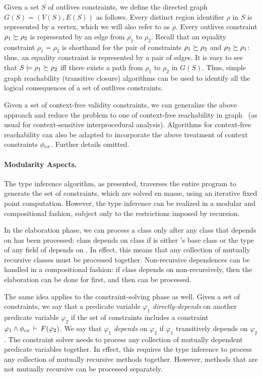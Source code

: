 Given a set $S$ of outlives constraints, we define the directed
graph $G(S)=(V(S),E(S))$ as follows.
Every distinct region identifier $\rho$ in $S$ is represented by a vertex,
which we will also refer to as $\rho$.
Every outlives constraint $\rho_1 \succeq \rho_2$ is represented by
an edge from $\rho_1$ to $\rho_2$.
Recall that an equality constraint $\rho_1 = \rho_2$ is shorthand
for the pair of constraints $\rho_1 \succeq \rho_2$ and
$\rho_2 \succeq \rho_1$: thus, an equality constraint is represented
by a pair of edges.
%
It is easy to see that $S \models \rho_1 \succeq \rho_2$ iff
there exists a path from $\rho_1$ to $\rho_2$ in $G(S)$.
%
Thus, simple graph reachability (transitive closure) algorithms can be
used to identify all the logical consequences of a set of outlives
constraints.

Given a set of context-free validity constraints, we can generalize the
above approach and reduce the problem to one of context-free reachability
in graph~\cite{Reps:Reachability} (as usual for context-sensitive interprocedural analysis).
%
Algorithms for context-free reachability can also be adapted to incorporate
the above treatment of context constraints $\phi_{cx}$.
%
Further details omitted.

\paragraph{Modularity Aspects.}
The type inference algorithm, as presented, traverses the entire program to
generate the set of constraints, which are solved en masse, using an iterative
fixed point computation. However, the type inference can be realized in a
modular and compositional fashion, subject only to the restrictions imposed
by recursion.

In the elaboration phase, we can process a class  only after any class
 that  depends on has been processed: class  depends on
class  if  is either 's base class or the type of any field
of  depends on . In effect, this means that any collection of
mutually recursive classes must be processed together. Non-recursive
dependences can be handled in a compositional fashion: if class 
depends on  non-recursively, then the elaboration can be done for
 first, and then  can be processed.

The same idea applies to the constraint-solving phase as well.
Given a set of constraints, we say that a predicate variable $\varphi_1$
\emph{directly-depends} on another predicate variable $\varphi_2$ if the set of
constraints includes a constraint $\varphi_1 \wedge \phi_{cx}\,\vdash\,F(\varphi_2)$.
We say that $\varphi_1$ \emph{depends} on $\varphi_2$ if $\varphi_1$ transitively
depends on $\varphi_2$.
The constraint solver needs to process any collection of mutually dependent
predicate variables together.
In effect, this requires the type inference to process any collection of
mutually recursive methods together.
However, methods that are not mutually recursive can be processed separately.

